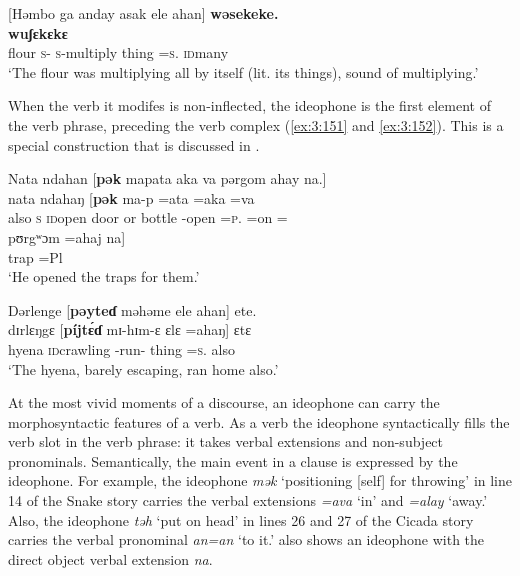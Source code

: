 \ea \label{ex:3:150}
[Həmbo  ga  anday  asak  ele  ahan]  \textbf{wəsekeke.}\\
\gll  [hʊmbɔ  ga  a-ndaj    a-sak    ɛlɛ  =ahaŋ]    \textbf{wuʃɛkɛkɛ}\\
      flour  {\ADJ}  \textsc{s}-{\PRG}    \textsc{s}-multiply  thing  =\textsc{s}.{\POSS}  \textsc{id}many\\
\glt  ‘The flour was multiplying all by itself (lit. its things), sound of multiplying.’
\z

When the verb it modifes is non-inflected, the ideophone is the first element of the verb phrase, preceding the verb complex (\ref{ex:3:151} and \ref{ex:3:152}).  This is a special construction that is discussed in .

\ea \label{ex:3:151}
Nata  ndahan  [\textbf{pək}  mapata  aka  va  pərgom  ahay  na.]\\
\gll nata  ndahaŋ  [\textbf{pək}      ma-p =ata =aka =va  \\
      also    \textsc{s}  {\textsc{id}open door or bottle} {\NOM}{}-open =\textsc{p}.{\IO} =on ={\PRF} \\
      
      \medskip
\gll pʊrgʷɔm  =ahaj  na]\\
     trap    =Pl  {\PSP}\\
\glt ‘He opened the traps for them.’
\z

\ea \label{ex:3:152}
Dərlenge  [\textbf{pəyteɗ}  məhəme  ele  ahan]  ete.\\
\gll  dɪrlɛŋgɛ  [\textbf{píjt\'{ɛ}ɗ}    mɪ-hɪm-ɛ  ɛlɛ  =ahaŋ]    ɛtɛ\\
      hyena  \textsc{id}crawling  {\NOM}{}-run-{\CL}  thing  =\textsc{s}.{\POSS}  also\\
\glt  ‘The hyena, barely escaping, ran home also.’
\z

At the most vivid moments of a discourse, an ideophone can carry the morphosyntactic features of a verb. As a verb the ideophone syntactically fills the verb slot in the verb phrase: it takes verbal extensions and non-subject pronominals. Semantically, the main event in a clause is expressed by the ideophone. For example, the ideophone \textit{mək} ‘positioning [self] for throwing’ in line 14 of the Snake story  carries the verbal extensions \textit{=ava} ‘in’ and\textit{ =alay} ‘away.’ Also, the ideophone \textit{təh} ‘put on head’ in lines 26 and 27 of the Cicada story  carries the verbal pronominal \textit{an=an} ‘to it.’  also shows an ideophone with the direct object verbal extension \textit{na}.

